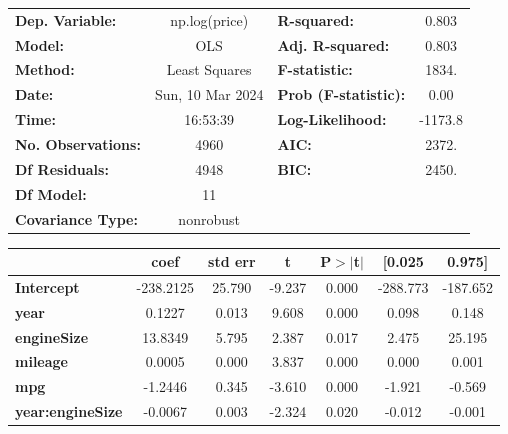 \documentclass[
  letterpaper,
  DIV=11,
  numbers=noendperiod]{scrreprt}
\begin{document}
\begin{center}
\begin{tabular}{lclc}
\toprule
\textbf{Dep. Variable:}     &  np.log(price)   & \textbf{  R-squared:         } &     0.803   \\
\textbf{Model:}             &       OLS        & \textbf{  Adj. R-squared:    } &     0.803   \\
\textbf{Method:}            &  Least Squares   & \textbf{  F-statistic:       } &     1834.   \\
\textbf{Date:}              & Sun, 10 Mar 2024 & \textbf{  Prob (F-statistic):} &     0.00    \\
\textbf{Time:}              &     16:53:39     & \textbf{  Log-Likelihood:    } &   -1173.8   \\
\textbf{No. Observations:}  &        4960      & \textbf{  AIC:               } &     2372.   \\
\textbf{Df Residuals:}      &        4948      & \textbf{  BIC:               } &     2450.   \\
\textbf{Df Model:}          &          11      & \textbf{                     } &             \\
\textbf{Covariance Type:}   &    nonrobust     & \textbf{                     } &             \\
\bottomrule
\end{tabular}
\begin{tabular}{lcccccc}
                            & \textbf{coef} & \textbf{std err} & \textbf{t} & \textbf{P$> |$t$|$} & \textbf{[0.025} & \textbf{0.975]}  \\
\midrule
\textbf{Intercept}          &    -238.2125  &       25.790     &    -9.237  &         0.000        &     -288.773    &     -187.652     \\
\textbf{year}               &       0.1227  &        0.013     &     9.608  &         0.000        &        0.098    &        0.148     \\
\textbf{engineSize}         &      13.8349  &        5.795     &     2.387  &         0.017        &        2.475    &       25.195     \\
\textbf{mileage}            &       0.0005  &        0.000     &     3.837  &         0.000        &        0.000    &        0.001     \\
\textbf{mpg}                &      -1.2446  &        0.345     &    -3.610  &         0.000        &       -1.921    &       -0.569     \\
\textbf{year:engineSize}    &      -0.0067  &        0.003     &    -2.324  &         0.020        &       -0.012    &       -0.001     \\

\end{tabular}
\end{center}
\end{document}
